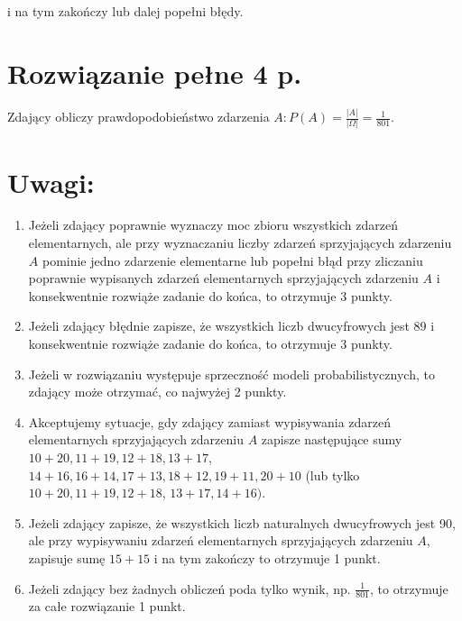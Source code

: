 \documentclass[10pt]{article}
\begin{document}
i na tym zakończy lub dalej popełni błędy.

\section*{Rozwiązanie pełne 4 p.}
Zdający obliczy prawdopodobieństwo zdarzenia $A: P(A)=\frac{|A|}{|\Omega|}=\frac{1}{801}$.

\section*{Uwagi:}
\begin{enumerate}
  \item Jeżeli zdający poprawnie wyznaczy moc zbioru wszystkich zdarzeń elementarnych, ale przy wyznaczaniu liczby zdarzeń sprzyjających zdarzeniu $A$ pominie jedno zdarzenie elementarne lub popełni błąd przy zliczaniu poprawnie wypisanych zdarzeń elementarnych sprzyjających zdarzeniu $A$ i konsekwentnie rozwiąże zadanie do końca, to otrzymuje 3 punkty.
  \item Jeżeli zdający błędnie zapisze, że wszystkich liczb dwucyfrowych jest 89 i konsekwentnie rozwiąże zadanie do końca, to otrzymuje 3 punkty.
  \item Jeżeli w rozwiązaniu występuje sprzeczność modeli probabilistycznych, to zdający może otrzymać, co najwyżej 2 punkty.
  \item Akceptujemy sytuacje, gdy zdający zamiast wypisywania zdarzeń elementarnych sprzyjających zdarzeniu $A$ zapisze następujące sumy $10+20,11+19,12+18,13+17$, $14+16,16+14,17+13,18+12,19+11,20+10$ (lub tylko $10+20,11+19,12+18$, $13+17,14+16)$.
  \item Jeżeli zdający zapisze, że wszystkich liczb naturalnych dwucyfrowych jest 90, ale przy wypisywaniu zdarzeń elementarnych sprzyjających zdarzeniu $A$, zapisuje sumę $15+15$ i na tym zakończy to otrzymuje 1 punkt.
  \item Jeżeli zdający bez żadnych obliczeń poda tylko wynik, np. $\frac{1}{801}$, to otrzymuje za całe rozwiązanie 1 punkt.
\end{enumerate}
\end{document}
